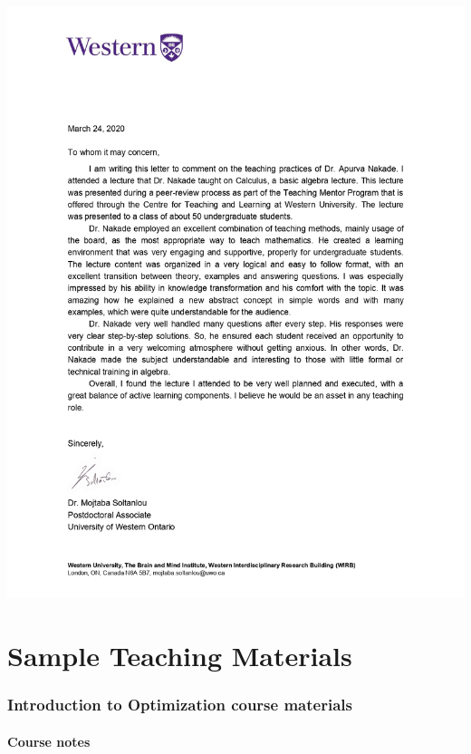 \documentclass[
]{report}
\begin{document}
\includegraphics{images/2020 UWO CTL Teaching Mentor Program_page-0003.jpg}

\hypertarget{appendix-appendix}{%
\appendix {}}


\hypertarget{sample-teaching-materials}{%
\chapter{Sample Teaching Materials}\label{sample-teaching-materials}}

\hypertarget{introduction-to-optimization-course-materials}{%
\subsection{Introduction to Optimization course materials}\label{introduction-to-optimization-course-materials}}

\hypertarget{course-notes}{%
\subsubsection{Course notes}\label{course-notes}}
\end{document}
